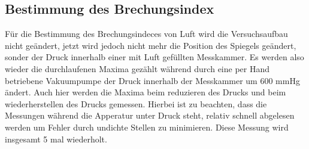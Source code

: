     \subsection{Bestimmung des Brechungsindex}

        \noindent Für die Bestimmung des Brechungsindeces von Luft wird die Versuchsaufbau nicht geändert, jetzt wird jedoch nicht mehr die Position 
        des Spiegels geändert, sonder der Druck innerhalb einer mit Luft gefüllten Messkammer. Es werden also wieder die durchlaufenen Maxima 
        gezählt während durch eine per Hand betriebene Vakuumpumpe der Druck innerhalb der Messkammer um 600 mmHg ändert. Auch hier werden 
        die Maxima beim reduzieren des Drucks und beim wiederherstellen des Drucks gemessen. Hierbei ist zu beachten, dass die Messungen während 
        die Apperatur unter Druck steht, relativ schnell abgelesen werden um Fehler durch undichte Stellen zu minimieren. Diese Messung 
        wird insgesamt 5 mal wiederholt.


    

